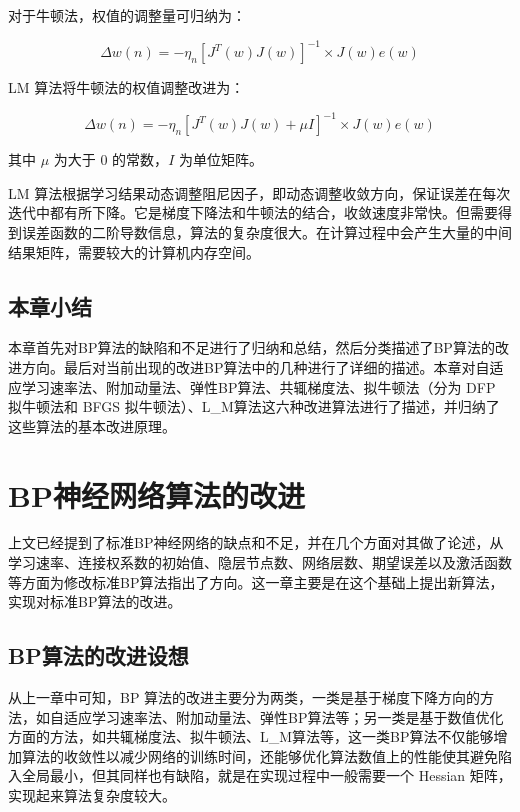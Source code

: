 \documentclass[UTF8]{ctexart}
\begin{document}
对于牛顿法，权值的调整量可归纳为：\par

\begin{equation}
\Delta w(n) = -\eta_n [J^T(w) J(w)] ^{-1} \times J(w)e(w)
\end{equation}

LM 算法将牛顿法的权值调整改进为：

\begin{equation}
\Delta w(n) = -\eta_n [J^T(w) J(w) + \mu I] ^{-1} \times J(w)e(w)
\end{equation}

其中 $\mu$ 为大于 $0$ 的常数，$I$ 为单位矩阵。 \par

LM 算法根据学习结果动态调整阻尼因子，即动态调整收敛方向，保证误差在每次迭代中都有所下降。它是梯度下降法和牛顿法的结合，收敛速度非常快。但需要得到误差函数的二阶导数信息，算法的复杂度很大。在计算过程中会产生大量的中间结果矩阵，需要较大的计算机内存空间。 

\subsection{本章小结}

本章首先对BP算法的缺陷和不足进行了归纳和总结，然后分类描述了BP算法的改进方向。最后对当前出现的改进BP算法中的几种进行了详细的描述。本章对自适应学习速率法、附加动量法、弹性BP算法、共辄梯度法、拟牛顿法（分为 DFP 拟牛顿法和 BFGS 拟牛顿法）、L\_M算法这六种改进算法进行了描述，并归纳了这些算法的基本改进原理。

\section{BP神经网络算法的改进}

上文已经提到了标准BP神经网络的缺点和不足，并在几个方面对其做了论述，从学习速率、连接权系数的初始值、隐层节点数、网络层数、期望误差以及激活函数等方面为修改标准BP算法指出了方向。这一章主要是在这个基础上提出新算法，实现对标准BP算法的改进。

\subsection {BP算法的改进设想}

从上一章中可知，BP 算法的改进主要分为两类，一类是基于梯度下降方向的方法，如自适应学习速率法、附加动量法、弹性BP算法等；另一类是基于数值优化方面的方法，如共辄梯度法、拟牛顿法、L\_M算法等，这一类BP算法不仅能够增加算法的收敛性以减少网络的训练时间，还能够优化算法数值上的性能使其避免陷入全局最小，但其同样也有缺陷，就是在实现过程中一般需要一个 Hessian 矩阵，实现起来算法复杂度较大。 \par
\end{document}
